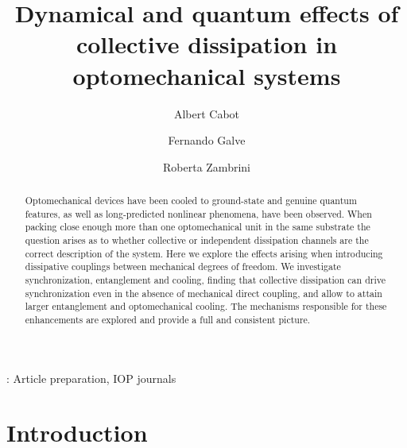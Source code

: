 \documentclass[a4paper]{jpconf}
\begin{document}
\title{Dynamical and quantum effects of collective dissipation in optomechanical systems}

\author{Albert Cabot}
\address{IFISC (UIB-CSIC), Instituto de Fisica Interdisciplinar y Sistemas 
Complejos, Palma de Mallorca, Spain.}

\author{Fernando Galve}
\address{IFISC (UIB-CSIC), Instituto de Fisica Interdisciplinar y Sistemas 
Complejos, Palma de Mallorca, Spain.}


\author{Roberta Zambrini}
\address{IFISC (UIB-CSIC), Instituto de Fisica Interdisciplinar y Sistemas 
Complejos, Palma de Mallorca, Spain.}


\begin{abstract}
Optomechanical devices have been cooled to ground-state and genuine quantum features, as well as long-predicted nonlinear phenomena, have been observed.
When packing close enough more than one optomechanical unit in the same substrate the 
question arises as to whether collective or independent dissipation channels are the correct description
of the system. Here we explore the effects arising when introducing dissipative couplings  between
mechanical degrees of freedom. We investigate synchronization, entanglement and cooling, finding that collective dissipation can drive 
synchronization  even in the absence of mechanical direct coupling, and allow to attain larger entanglement and optomechanical cooling. 
The mechanisms  responsible for these enhancements are explored and provide a full and consistent picture.  
\end{abstract}



\vspace{2pc}
: Article preparation, IOP journals

\section{Introduction}
\end{document}
